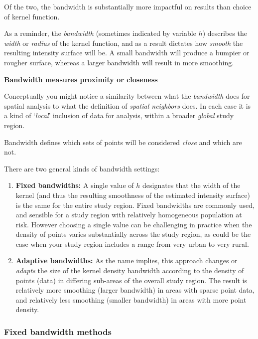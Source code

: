 \documentclass[
]{book}
\providecommand{\tightlist}{%
  \setlength{\itemsep}{0pt}\setlength{\parskip}{0pt}}
\newenvironment{rmdnote}[1]
  {
  \begin{itemize}
  \renewcommand{\labelitemi}{
    \raisebox{-.7\height}[0pt][0pt]{
      {\setkeys{Gin}{width=3em,keepaspectratio}\texttt{[image: images/\#1]}}
    }
  }
  \setlength{\fboxsep}{1em}
  \begin{note}
  \item
  }
  {
  \end{note}
  \end{itemize}
  }
\begin{document}
Of the two, the bandwidth is substantially more impactful on results than choice of kernel function.

As a reminder, the \emph{bandwidth} (sometimes indicated by variable \(h\)) describes the \emph{width} or \emph{radius} of the kernel function, and as a result dictates how \emph{smooth} the resulting intensity surface will be. A small bandwidth will produce a bumpier or rougher surface, whereas a larger bandwidth will result in more smoothing.

\begin{rmdnote}{note}
\textbf{Bandwidth measures proximity or closeness}

Conceptually you might notice a similarity between what the \emph{bandwidth} does for spatial analysis to what the definition of \emph{spatial neighbors} does. In each case it is a kind of `\emph{local}' inclusion of data for analysis, within a broader \emph{global} study region.

Bandwidth defines which sets of points will be considered \emph{close} and which are not.

\end{rmdnote}

There are two general kinds of bandwidth settings:

\begin{enumerate}
\def\labelenumi{\arabic{enumi}.}
\tightlist
\item
  \textbf{Fixed bandwidths:} A single value of \(h\) designates that the width of the kernel (and thus the resulting smoothness of the estimated intensity surface) is the same for the entire study region. Fixed bandwidths are commonly used, and sensible for a study region with relatively homogeneous population at risk. However choosing a single value can be challenging in practice when the density of points varies substantially across the study region, as could be the case when your study region includes a range from very urban to very rural.
\item
  \textbf{Adaptive bandwidths:} As the name implies, this approach changes or \emph{adapts} the size of the kernel density bandwidth according to the density of points (data) in differing sub-areas of the overall study region. The result is relatively more smoothing (larger bandwidth) in areas with sparse point data, and relatively less smoothing (smaller bandwidth) in areas with more point density.
\end{enumerate}

\hypertarget{fixed-bandwidth-methods}{%
\subsubsection{Fixed bandwidth methods}\label{fixed-bandwidth-methods}}
\end{document}

